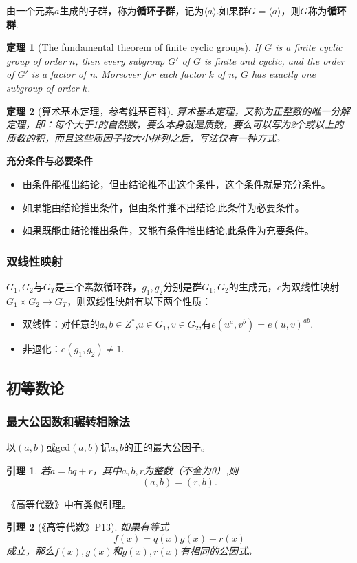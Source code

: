 \documentclass[10pt]{ctexart}
\newtheorem{lemma}{引理}
\newtheorem{theorem}{定理}
\begin{document}
由一个元素$a$生成的子群，称为\textbf{循环子群}，记为$\langle a \rangle $.如果群$G=\langle a \rangle$，则$G$称为\textbf{循环群}.

\begin{theorem}[The fundamental theorem of finite cyclic groups]
    If $G$ is a finite cyclic group of order $n$, then every subgroup $G \prime$ of $G$ is finite and cyclic, and the order of $G \prime$ is a factor of n. Moreover for each factor $k$ of $n$, $G$ has exactly one subgroup of order $k$.
\end{theorem}

\begin{theorem}[算术基本定理，参考维基百科]
	算术基本定理，又称为正整数的唯一分解定理，即：每个大于1的自然数，要么本身就是质数，要么可以写为2个或以上的质数的积，而且这些质因子按大小排列之后，写法仅有一种方式。
\end{theorem}

\textbf{充分条件与必要条件}
\begin{itemize}
	\item 由条件能推出结论，但由结论推不出这个条件，这个条件就是充分条件。
	\item 如果能由结论推出条件，但由条件推不出结论,此条件为必要条件。
	\item 如果既能由结论推出条件，又能有条件推出结论,此条件为充要条件。
\end{itemize}

\subsubsection{双线性映射}
$G_1,G_2$与$G_T$是三个素数循环群，$g_1,g_2$分别是群$G_1, G_2$的生成元，$e$为双线性映射 $G_1 \times G_2 \rightarrow G_T$，则双线性映射有以下两个性质：
\begin{itemize}
    \item 双线性：对任意的$a,b \in Z^*$,$u \in G_1, v \in G_2$,有$e(u^a,v^b)=e(u,v)^{ab}$.
    \item 非退化：$e(g_1,g_2) \neq 1$.
\end{itemize}

\subsection{初等数论}
\subsubsection{最大公因数和辗转相除法}
以$(a,b)$或gcd$(a,b)$记$a,b$的正的最大公因子。
\begin{lemma}\label{lemma:abqr}
	若$a=bq+r$，其中$a,b,r$为整数（不全为0）,则
	$$
	(a,b)=(r,b).
	$$
\end{lemma}
《高等代数》中有类似引理。
\begin{lemma}[《高等代数》P13]
	如果有等式
	\begin{equation}
		f(x) = q(x)g(x)+r(x)
	\end{equation}
	成立，那么$f(x),g(x)$和$g(x),r(x)$有相同的公因式。
\end{lemma}
\end{document}
